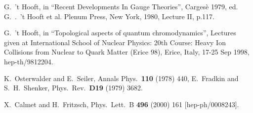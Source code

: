\documentclass[a4paper,12pt]{article}
\begin{document}
\begin{thebibliography}{10}
 G.~'t Hooft, in ``Recent Developments In
  Gauge Theories'', Carges\`e 1979, ed.  G.~.~'t Hooft et al. Plenum
  Press, New York, 1980, Lecture II, p.117. 

 G.~'t Hooft, in ``Topological aspects of
  quantum chromodynamics'', Lectures given at International School of
  Nuclear Physics: 20th Course: Heavy Ion Collisions from Nuclear to
  Quark Matter (Erice 98), Erice, Italy, 17-25 Sep 1998,
hep-th/9812204.

K.~Osterwalder and E.~Seiler,
Annals Phys.\  {\bf 110} (1978) 440,
%
E.~Fradkin and S.~H.~Shenker,
Phys.\ Rev.\  {\bf D19} (1979) 3682.

X.~Calmet and H.~Fritzsch,
Phys.\ Lett.\ B {\bf 496} (2000) 161
[hep-ph/0008243].


\end{thebibliography}
\end{document}
